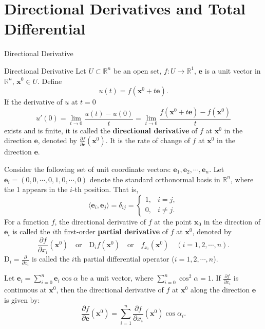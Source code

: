 \documentclass[11pt]{../../TexTemplate/elegantbook}
\begin{document}
\section{Directional Derivatives and Total Differential}
\begin{leftbarTitle}{Directional Derivative}\end{leftbarTitle}
\begin{definition}{Directional Derivative}
    Let \(U\subset \mathbb{R}^n\) be an open set, \(f: U\to \mathbb{R}^{1}\),
    \(\mathbf{e}\) is a unit vector in \(\mathbb{R}^{n}\), \(\mathbf{x}^{0}\in U\). Define
    \[
    u(t) = f(\mathbf{x}^{0} + t\mathbf{e}).
    \]
    If the derivative of \(u\) at \(t=0\) 
    \[ 
        u'(0) = \lim_{t \to 0} \frac{u(t) - u(0)}{t} = 
        \lim_{t \to 0} \frac{f(\mathbf{x}^{0} + t\mathbf{e}) - f(\mathbf{x}^{0})}{t} 
    \] 
    exists and is finite, 
    it is called the \textbf{directional derivative} of \(f\) at \(\mathbf{x}^{0}\) in the direction \(\mathbf{e}\), 
    denoted by \(\frac{\partial f}{\partial \mathbf{e}}(\mathbf{x}^{0})\). 
    It is the rate of change of \(f\) at \(\mathbf{x}^{0}\) in the direction \(\mathbf{e}\).
\end{definition}

Consider the following set of unit coordinate vectors: \(\mathbf{e}_{1},\mathbf{e}_{2},\cdots,\mathbf{e}_{n}\).
Let \(\mathbf{e}_{i}=\left( 0, 0, \cdots, 0, 1, 0, \cdots, 0 \right)  \) denote the standard orthonormal basis 
in \(\mathbb{R}^{n}\), where the 1 appears in the \(i\)-th position. That is,
\[
    \langle \mathbf{e}_{i}, \mathbf{e}_{j} \rangle = \delta_{i j} = \begin{cases}
    1, & i = j, \\
    0, & i \neq j.
    \end{cases}
\]
For a function \( f \), the directional derivative of \( f \) at the point \( \mathbf{x}_{0} \) 
in the direction of \( \mathbf{e}_{i} \) 
is called the \( i \)th first-order \textbf{partial derivative} of \( f \) at \(\mathbf{x}^{0}\), denoted by
\[
\frac{\partial f}{\partial x_i}(\mathbf{x}^{0}) \quad \text{or} 
\quad \mathrm{D}_i f(\mathbf{x}^{0})  \quad \text{or} 
\quad f_{x_i}(\mathbf{x}^{0}) \quad (i = 1, 2, \cdots, n).
\]
\( \mathrm{D}_i = \frac{\partial}{\partial x_i} \) is called the \( i \)th partial differential operator (\( i = 1, 2, \cdots, n \)).

Let \(\mathbf{e}_{i}=\sum_{i=0}^{n} \mathbf{e}_{i}\cos\alpha\) be a unit vector, 
where \(\sum_{i=0}^{n} \cos^2\alpha = 1\).
If \(\frac{\partial f}{\partial x_{i}}\) is continuous at \(\mathbf{x}^0\), 
then the directional derivative of \(f\) at \(\mathbf{x}^0\) along the direction \(\mathbf{e}\) is given by:
\[
\frac{\partial f}{\partial \mathbf{e}}(\mathbf{x}^0) = \sum_{i=1}^n \frac{\partial f}{\partial x_i}(\mathbf{x}^0) \cos \alpha_i.
\]
\end{document}
